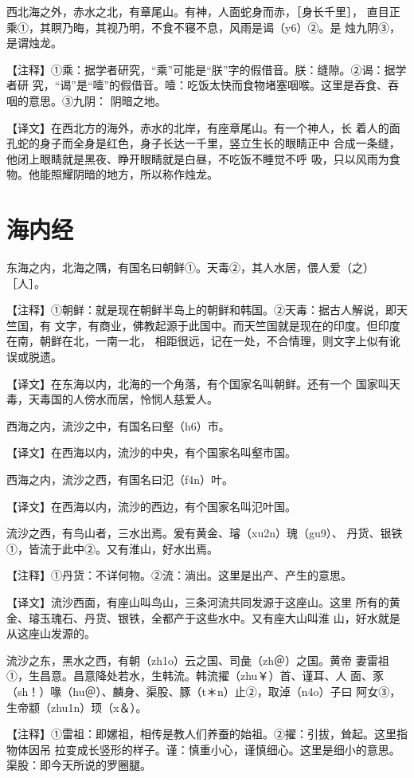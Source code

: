 \documentclass[a4paper,12pt,UTF8,twoside]{ctexbook}
\begin{document}
西北海之外，赤水之北，有章尾山。有神，人面蛇身而赤，［身长千里］， 直目正乘①，其瞑乃晦，其视乃明，不食不寝不息，风雨是谒（y6）②。是 烛九阴③，是谓烛龙。

【注释】①乘：据学者研究，“乘”可能是“朕”字的假借音。朕：缝隙。②谒：据学者研 究，“谒”是“噎”的假借音。噎：吃饭太快而食物堵塞咽喉。这里是吞食、吞咽的意思。③九阴： 阴暗之地。

【译文】在西北方的海外，赤水的北岸，有座章尾山。有一个神人，长 着人的面孔蛇的身子而全身是红色，身子长达一千里，竖立生长的眼睛正中 合成一条缝，他闭上眼睛就是黑夜、睁开眼睛就是白昼，不吃饭不睡觉不呼 吸，只以风雨为食物。他能照耀阴暗的地方，所以称作烛龙。

\chapter{海内经}

东海之内，北海之隅，有国名曰朝鲜①。天毒②，其人水居，偎人爱（之） ［人］。

【注释】①朝鲜：就是现在朝鲜半岛上的朝鲜和韩国。②天毒：据古人解说，即天竺国，有 文字，有商业，佛教起源于此国中。而天竺国就是现在的印度。但印度在南，朝鲜在北，一南一北， 相距很远，记在一处，不合情理，则文字上似有讹误或脱遗。

【译文】在东海以内，北海的一个角落，有个国家名叫朝鲜。还有一个 国家叫天毒，天毒国的人傍水而居，怜悯人慈爱人。

西海之内，流沙之中，有国名曰壑（h6）市。

【译文】在西海以内，流沙的中央，有个国家名叫壑市国。

西海之内，流沙之西，有国名曰氾（f4n）叶。

【译文】在西海以内，流沙的西边，有个国家名叫氾叶国。

流沙之西，有鸟山者，三水出焉。爰有黄金、璿（xu2n）瑰（gu9）、 丹货、银铁①，皆流于此中②。又有淮山，好水出焉。

【注释】①丹货：不详何物。②流：淌出。这里是出产、产生的意思。

【译文】流沙西面，有座山叫鸟山，三条河流共同发源于这座山。这里 所有的黄金、璿玉瑰石、丹货、银铁，全都产于这些水中。又有座大山叫淮 山，好水就是从这座山发源的。

流沙之东，黑水之西，有朝（zh1o）云之国、司彘（zh＠）之国。黄帝 妻雷祖①，生昌意。昌意降处若水，生韩流。韩流擢（zhu￥）首、谨耳、人 面、豕（sh！）喙（hu＠）、麟身、渠股、豚（t＊n）止②，取淖（n4o）子曰 阿女③，生帝颛（zhu1n）顼（x＆）。

【注释】①雷祖：即嫘祖，相传是教人们养蚕的始祖。②擢：引拔，耸起。这里指物体因吊 拉变成长竖形的样子。谨：慎重小心，谨慎细心。这里是细小的意思。渠股：即今天所说的罗圈腿。
\end{document}
